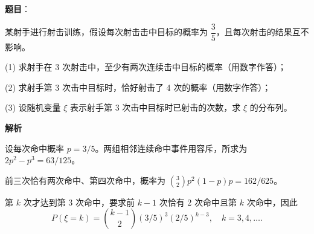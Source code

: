 \begin{answer}

\textbf{题目}：

某射手进行射击训练，假设每次射击击中目标的概率为 \(\dfrac35\)，且每次射击的结果互不影响。

(1) 求射手在 3 次射击中，至少有两次连续击中目标的概率（用数字作答）；

(2) 求射手第 3 次击中目标时，恰好射击了 4 次的概率（用数字作答）；

(3) 设随机变量 \(\xi\) 表示射手第 3 次击中目标时已射击的次数，求 \(\xi\) 的分布列。

\textbf{解析}


设每次命中概率 \(p=3/5\)。两组相邻连续命中事件用容斥，所求为 \(2p^2-p^3=63/125\)。


前三次恰有两次命中、第四次命中，概率为 \(\binom32p^2(1-p)p=162/625\)。


第 \(k\) 次才达到第 3 次命中，要求前 \(k-1\) 次恰有 2 次命中且第 \(k\) 次命中，因此
\nopagebreak[4]
\[
P(\xi=k)=\binom{k-1}{2}(3/5)^3(2/5)^{k-3},\quad k=3,4,\ldots.
\]




\end{answer}

